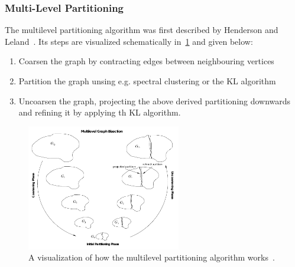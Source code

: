             \subsubsection*{Multi-Level Partitioning}\label{mlp}
                The multilevel partitioning algorithm was first described by Henderson and Leland~\autocite{hendrickson1995multi}. 
                Its steps are visualized schematically in~\ref{mlp-fig} and given below:
                \begin{enumerate}
                    \item Coarsen the graph by contracting edges between neighbouring vertices
                    \item Partition the graph unsing e.g. spectral clustering or the KL algorithm
                    \item Uncoarsen the graph, projecting the above derived partitioning downwards and refining it by applying th KL algorithm.
                \end{enumerate}
                
                \begin{figure}[htp]
                    \begin{center}
                        \includegraphics[keepaspectratio,width=0.6\textwidth]{img/03-graphs/multilevel.png}
                    \end{center}
                    \caption{A visualization of how the multilevel partitioning algorithm works~\autocite{karypis}.} 
                    \label{mlp-fig}
                \end{figure}
                    
